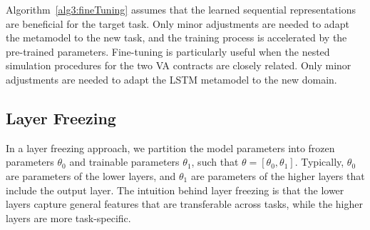 Algorithm~\ref{alg3:fineTuning} assumes that the learned sequential representations are beneficial for the target task.
Only minor adjustments are needed to adapt the metamodel to the new task, and the training process is accelerated by the pre-trained parameters.
Fine-tuning is particularly useful when the nested simulation procedures for the two VA contracts are closely related.
Only minor adjustments are needed to adapt the LSTM metamodel to the new domain.

\subsection{Layer Freezing}

In a layer freezing approach, we partition the model parameters into frozen parameters $\theta_0$ and trainable parameters $\theta_1$, such that $\theta = [\theta_0, \theta_1]$. 
Typically, $\theta_0$ are parameters of the lower layers, and $\theta_1$ are parameters of the higher layers that include the output layer.
The intuition behind layer freezing is that the lower layers capture general features that are transferable across tasks, while the higher layers are more task-specific.

